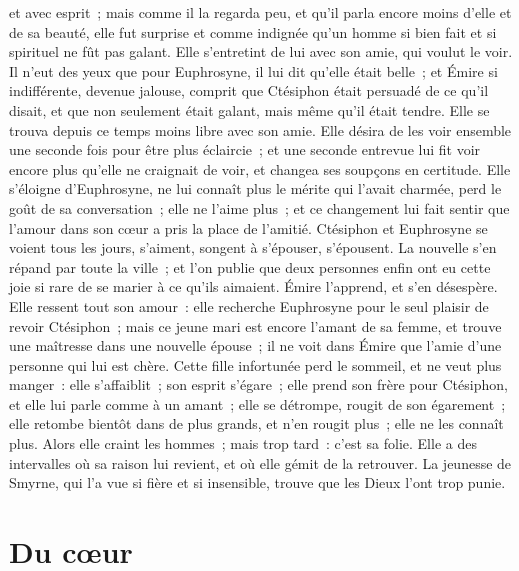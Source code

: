 \documentclass[french,twoside]{book} %
\newcommand\chapteropen{} %
\newcommand\chapterclose{} %
\begin{document}
et avec esprit ; mais comme il la regarda peu, et qu’il parla encore moins d’elle et de sa beauté, elle fut surprise et comme indignée qu’un homme si bien fait et si spirituel ne fût pas galant. Elle s’entretint de lui avec son amie, qui voulut le voir. Il n’eut des yeux que pour Euphrosyne, il lui dit qu’elle était belle ; et Émire si indifférente, devenue jalouse, comprit que Ctésiphon était persuadé de ce qu’il disait, et que non seulement était galant, mais même qu’il était tendre. Elle se trouva depuis ce temps moins libre avec son amie. Elle désira de les voir ensemble une seconde fois pour être plus éclaircie ; et une seconde entrevue lui fit voir encore plus qu’elle ne craignait de voir, et changea ses soupçons en certitude. Elle s’éloigne d’Euphrosyne, ne lui connaît plus le mérite qui l’avait charmée, perd le goût de sa conversation ; elle ne l’aime plus ; et ce changement lui fait sentir que l’amour dans son cœur a pris la place de l’amitié. Ctésiphon et Euphrosyne se voient tous les jours, s’aiment, songent à s’épouser, s’épousent. La nouvelle s’en répand par toute la ville ; et l’on publie que deux personnes enfin ont eu cette joie si rare de se marier à ce qu’ils aimaient. Émire l’apprend, et s’en désespère. Elle ressent tout son amour : elle recherche Euphrosyne pour le seul plaisir de revoir Ctésiphon ; mais ce jeune mari est encore l’amant de sa femme, et trouve une maîtresse dans une nouvelle épouse ; il ne voit dans Émire que l’amie d’une personne qui lui est chère. Cette fille infortunée perd le sommeil, et ne veut plus manger : elle s’affaiblit ; son esprit s’égare ; elle prend son frère pour Ctésiphon, et elle lui parle comme à un amant ; elle se détrompe, rougit de son égarement ; elle retombe bientôt dans de plus grands, et n’en rougit plus ; elle ne les connaît plus. Alors elle craint les hommes ; mais trop tard : c’est sa folie. Elle a des intervalles où sa raison lui revient, et où elle gémit de la retrouver. La jeunesse de Smyrne, qui l’a vue si fière et si insensible, trouve que les Dieux l’ont trop punie.
\chapterclose


\chapteropen
\chapter[{Du cœur}]{Du cœur}
\label{lb-coeur}\renewcommand{\leftmark}{Du cœur}
\end{document}
